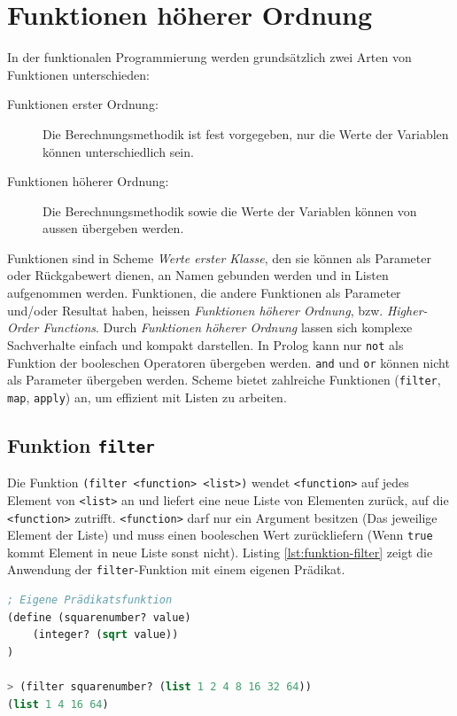 \section{Funktionen höherer Ordnung}

In der funktionalen Programmierung werden grundsätzlich zwei Arten von Funktionen unterschieden:
\begin{description}
	\item[Funktionen erster Ordnung:] Die Berechnungsmethodik ist fest vorgegeben, nur die Werte der Variablen können unterschiedlich sein.
	\item[Funktionen höherer Ordnung:] Die Berechnungsmethodik sowie die Werte der Variablen können von aussen übergeben werden.
\end{description}
Funktionen sind in Scheme \textit{Werte erster Klasse}, den sie können als Parameter oder Rückgabewert dienen, an Namen gebunden werden und in Listen aufgenommen werden. Funktionen, die andere Funktionen als Parameter und/oder Resultat haben, heissen \textit{Funktionen höherer Ordnung}, bzw. \textit{Higher-Order Functions}. Durch \textit{Funktionen höherer Ordnung} lassen sich komplexe Sachverhalte einfach und kompakt darstellen. In Prolog kann nur \verb|not| als Funktion der booleschen Operatoren übergeben werden. \verb|and| und \verb|or| können nicht als Parameter übergeben werden. Scheme bietet zahlreiche Funktionen (\verb|filter|, \verb|map|, \verb|apply|) an, um effizient mit Listen zu arbeiten.

\subsection{Funktion \texttt{filter}}

Die Funktion \verb|(filter <function> <list>)| wendet \verb|<function>| auf jedes Element von  \verb|<list>| an und liefert eine neue Liste von Elementen zurück, auf die \verb|<function>| zutrifft. \verb|<function>| darf nur ein Argument besitzen (Das jeweilige Element der Liste) und muss einen booleschen Wert zurückliefern (Wenn \verb|true| kommt Element in neue Liste sonst nicht). Listing \ref{lst:funktion-filter} zeigt die Anwendung der \verb|filter|-Funktion mit einem eigenen Prädikat.

\begin{lstlisting}[language=Lisp, caption=Funktion filter, label=lst:funktion-filter]
; Eigene Prädikatsfunktion
(define (squarenumber? value)
	(integer? (sqrt value))
)

> (filter squarenumber? (list 1 2 4 8 16 32 64))
(list 1 4 16 64)
\end{lstlisting}

